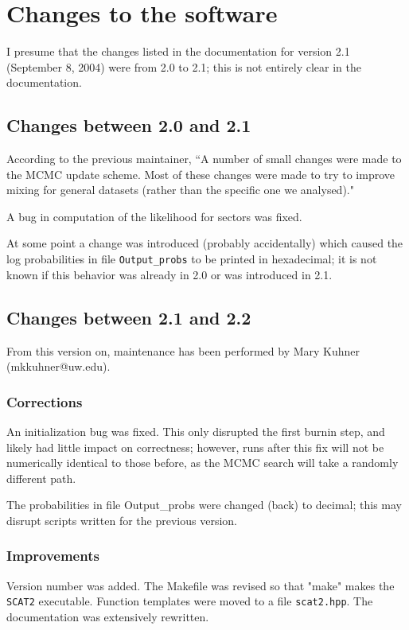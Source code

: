 \documentclass[10pt,titlepage,times,letterpaper]{article}
\def\SCAT{{\tt SCAT2} }
\begin{document}
\section{Changes to the software} 

I presume that the changes listed in the documentation for version 2.1
(September 8, 2004) were from 2.0 to 2.1; this is not entirely clear in
the documentation.

\subsection{Changes between 2.0 and 2.1}

According to the previous maintainer, ``A number of small changes were made to the MCMC update scheme.
Most of these changes were made to try to
improve mixing for general datasets (rather than the specific one we
analysed)."  

A bug in computation of the likelihood for sectors was fixed.

At some point a change was introduced (probably accidentally) which caused the log probabilities
in file {\tt Output\_probs} to be printed in hexadecimal; it is not known
if this behavior was already in 2.0 or was introduced in 2.1.

\subsection{Changes between 2.1 and 2.2}

From this version on, maintenance has been performed by Mary Kuhner
(mkkuhner@uw.edu).

\subsubsection{Corrections}
An initialization bug was fixed.  This only disrupted
the first burnin step, and likely had little impact on correctness; however,
runs after this fix will not be numerically identical to those before,
as the MCMC search will take a randomly different path.

The probabilities in file Output\_probs were
changed (back) to decimal; this may disrupt scripts written for the previous
version. 

\subsubsection{Improvements}
Version number was added.  The Makefile was revised so that "make" makes 
the \SCAT executable.
Function templates were moved to a file {\tt scat2.hpp}.
The documentation was extensively rewritten.
\end{document}
